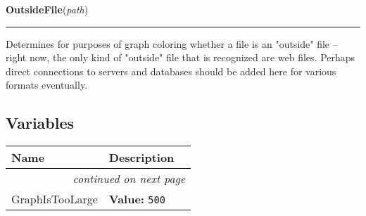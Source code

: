     \label{System:SystemGraphOperations:OutsideFile}

    \vspace{0.5ex}

\hspace{.8\funcindent}\begin{boxedminipage}{\funcwidth}

    \raggedright \textbf{OutsideFile}(\textit{path})

    \vspace{-1.5ex}

    \rule{\textwidth}{0.5\fboxrule}
\setlength{\parskip}{2ex}
    Determines for purposes of graph coloring whether a file is an 
    "outside" file -- right now, the only kind of "outside" file that is 
    recognized are web files. Perhaps direct connections to servers and 
    databases should be added here for various formats eventually.

\setlength{\parskip}{1ex}
    \end{boxedminipage}



  \subsection{Variables}

    \vspace{-1cm}
\hspace{\varindent}\begin{longtable}{|p{\varnamewidth}|p{\vardescrwidth}|l}
\cline{1-2}
\cline{1-2} \centering \textbf{Name} & \centering \textbf{Description}& \\
\cline{1-2}
\endhead\cline{1-2}\multicolumn{3}{r}{\small\textit{continued on next page}}\\\endfoot\cline{1-2}
\endlastfoot\raggedright G\-r\-a\-p\-h\-I\-s\-T\-o\-o\-L\-a\-r\-g\-e\- & \raggedright \textbf{Value:} 
{\tt 500}&\\
\cline{1-2}
\end{longtable}

